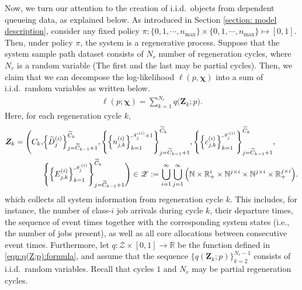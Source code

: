 \documentclass[11pt]{article}
\newcommand{\jp}[1]{\footnote{J-P: #1}}
\theoremstyle{remark}
\theoremstyle{definition}
\newcommand{\bs}[1]{{\boldsymbol #1 }}
\numberwithin{equation}{section}
\begin{document}
Now, we turn our attention to the creation of i.i.d.\ objects from dependent queueing data, as explained below.
As introduced in Section \ref{section: model description}, consider any fixed policy $\pi: \{0, 1, \cdots, n_{\max}\} \times \{0, 1, \cdots, n_{\max}\} \mapsto [0,1]$.
Then, under policy $\pi$, the system is a regenerative process.
Suppose that the system sample path dataset consists of $N_r$ number of regeneration cycles, where $N_r$ is a random variable (The first and the last may be partial cycles).
Then, we claim that we can decompose the log-likelihood $\ell(p, \bs\chi)$ into a sum of i.i.d.\ random variables as written below.
\begin{align*}
    \ell(p; \bs\chi) = \sum_{k=1}^{N_r} q\big(\bs{Z}_k; p\big).
\end{align*}
Here, for each regeneration cycle $k$,
\begin{align}\label{eqn: Z: state space}
    \bs{Z}_k = \Bigg(C_k, &\Big\{\widetilde{D}^{(i)}_j\Big\}_{j=\widetilde{C}_{k-1}+1}^{\widetilde{C}_k} ,
    \Bigg\{\Big\{n^{(i)}_{j,k}\Big\}_{k=1}^{\mathscr N^{(i)}_{j}+1}\Bigg\}_{j=\widetilde{C}_{k-1}+1}^{\widetilde{C}_k}, 
    \Bigg\{\Big\{c^{(i)}_{j,k}\Big\}_{k=1}^{\mathscr N^{(i)}_{j}}\Bigg\}_{j=\widetilde{C}_{k-1}+1}^{\widetilde{C}_k}, \notag
    \\
    &\Bigg\{\Big\{E^{(i)}_{j,k}\Big\}_{k=1}^{\mathscr N^{(i)}_{j}}\Bigg\}_{j=\widetilde{C}_{k-1}+1}^{\widetilde{C}_k}\Bigg)
    \in \mathscr{Z} := \bigcup_{i=1}^{\infty} \bigcup_{j=1}^{\infty} 
    \Big(\mathbb{N} \times \mathbb{R}^{i}_+ \times \mathbb{N}^{j \times i} \times \mathbb{N}^{j \times i} \times \mathbb{R}_{+}^{j \times i}\Big).
\end{align}
which collects all system information from regeneration cycle $k$. This includes, for instance, the number of class-$i$ job arrivals during cycle $k$, their departure times, the sequence of event times together with the corresponding system states (i.e., the number of jobs present), as well as all core allocations between consecutive event times.
Furthermore, let $q: \mathscr{Z} \times [0,1] \to \mathbb{R}$ be the function defined in \eqref{eqn:q(Z;p):formula}, and assume that the sequence $\big\{q(\bs{Z}_k; p)\big\}_{k=2}^{N_r-1}$ consists of i.i.d.\ random variables. Recall that cycles $1$ and $N_r$ may be partial regeneration cycles.
\end{document}
